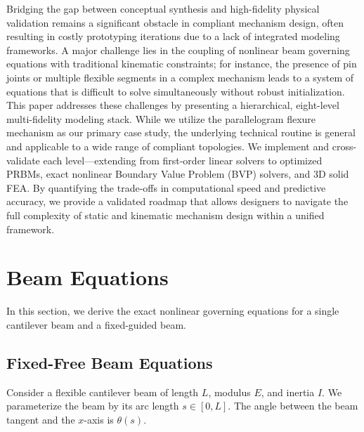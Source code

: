 \documentclass[colorlinks,upint,subscriptcorrection,varvw,hyphenate,balance]{asmeconf} %
\begin{document}
Bridging the gap between conceptual synthesis and high-fidelity physical validation remains a significant obstacle in compliant mechanism design, often resulting in costly prototyping iterations due to a lack of integrated modeling frameworks. A major challenge lies in the coupling of nonlinear beam governing equations with traditional kinematic constraints; for instance, the presence of pin joints or multiple flexible segments in a complex mechanism leads to a system of equations that is difficult to solve simultaneously without robust initialization. This paper addresses these challenges by presenting a hierarchical, eight-level multi-fidelity modeling stack. While we utilize the parallelogram flexure mechanism as our primary case study, the underlying technical routine is general and applicable to a wide range of compliant topologies. We implement and cross-validate each level---extending from first-order linear solvers to optimized PRBMs, exact nonlinear Boundary Value Problem (BVP) solvers, and 3D solid FEA. By quantifying the trade-offs in computational speed and predictive accuracy, we provide a validated roadmap that allows designers to navigate the full complexity of static and kinematic mechanism design within a unified framework.


\section{Beam Equations}
\label{sec:beam_equations}
In this section, we derive the exact nonlinear governing equations for a single cantilever beam and a fixed-guided beam.

\subsection{Fixed-Free Beam Equations}
Consider a flexible cantilever beam of length $L$, modulus $E$, and inertia $I$. We parameterize the beam by its arc length $s \in [0, L]$. The angle between the beam tangent and the $x$-axis is $\theta(s)$.
\end{document}
